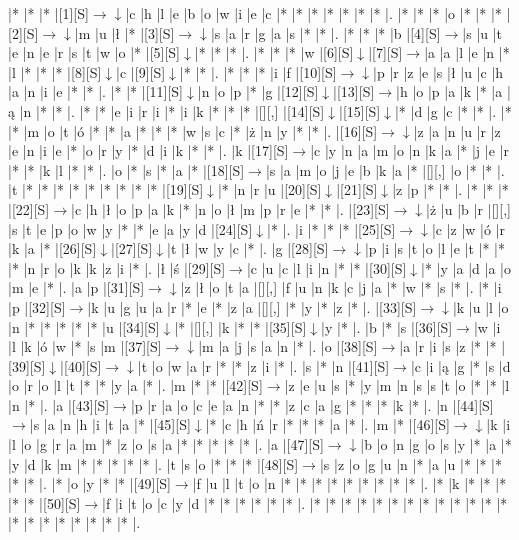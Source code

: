 \documentclass[11pt]{article}
\newcommand\drarr{$\rightarrow \!\!\!\!\! \downarrow$}
\newcommand\rarr{$\rightarrow$}
\newcommand\darr{$\downarrow$}
\begin{document}
\noindent\begin{Puzzle}{20}{31}|*	|*	|*	|[1][S]\drarr	|c	|h	|l	|e	|b	|o	|w	|i	|e	|c	|*	|*	|*	|*	|*	|*	|*	|.
|*	|*	|*	|o	|*	|*	|*	|[2][S]\drarr	|m	|u	|ł	|*	|[3][S]\drarr	|s	|a	|r	|g	|a	|s	|*	|*	|.
|*	|*	|*	|b	|[4][S]\rarr	|s	|u	|t	|e	|n	|e	|r	|s	|t	|w	|o	|*	|[5][S]\darr	|*	|*	|*	|.
|*	|*	|*	|w	|[6][S]\darr	|[7][S]\rarr	|a	|a	|l	|e	|n	|*	|l	|*	|*	|*	|[8][S]\darr	|c	|[9][S]\darr	|*	|*	|.
|*	|*	|*	|i	|f	|[10][S]\drarr	|p	|r	|z	|e	|s	|ł	|u	|c	|h	|a	|n	|i	|e	|*	|*	|.
|*	|*	|[11][S]\darr	|n	|o	|p	|*	|g	|[12][S]\darr	|[13][S]\rarr	|h	|o	|p	|a	|k	|*	|a	|ą	|n	|*	|*	|.
|*	|*	|e	|i	|r	|i	|*	|i	|k	|*	|*	|*	|[][,]{ }	|[14][S]\darr	|[15][S]\darr	|*	|d	|g	|c	|*	|*	|.
|*	|*	|m	|o	|t	|ó	|*	|*	|a	|*	|*	|*	|w	|s	|c	|*	|ż	|n	|y	|*	|*	|.
|[16][S]\drarr	|z	|a	|n	|u	|r	|z	|e	|n	|i	|e	|*	|o	|r	|y	|*	|d	|i	|k	|*	|*	|.
|k	|[17][S]\rarr	|c	|y	|n	|a	|m	|o	|n	|k	|a	|*	|j	|e	|r	|*	|*	|k	|l	|*	|*	|.
|o	|*	|s	|*	|a	|*	|[18][S]\rarr	|s	|a	|m	|o	|j	|e	|b	|k	|a	|*	|[][,]{ }	|o	|*	|*	|.
|t	|*	|*	|*	|*	|*	|*	|*	|*	|*	|[19][S]\darr	|*	|n	|r	|u	|[20][S]\darr	|[21][S]\darr	|z	|p	|*	|*	|.
|*	|*	|*	|[22][S]\rarr	|c	|h	|ł	|o	|p	|a	|k	|*	|n	|o	|ł	|m	|p	|r	|e	|*	|*	|.
|[23][S]\drarr	|ż	|u	|b	|r	|[][,]{ }	|s	|t	|e	|p	|o	|w	|y	|*	|*	|e	|a	|y	|d	|[24][S]\darr	|*	|.
|i	|*	|*	|*	|[25][S]\drarr	|c	|z	|w	|ó	|r	|k	|a	|*	|[26][S]\darr	|[27][S]\darr	|t	|ł	|w	|y	|c	|*	|.
|g	|[28][S]\drarr	|p	|i	|s	|t	|o	|l	|e	|t	|*	|*	|*	|n	|r	|o	|k	|k	|z	|i	|*	|.
|ł	|ś	|[29][S]\rarr	|c	|u	|c	|l	|i	|n	|*	|*	|[30][S]\darr	|*	|y	|a	|d	|a	|o	|m	|e	|*	|.
|a	|p	|[31][S]\drarr	|z	|ł	|o	|t	|a	|[][,]{ }	|f	|u	|n	|k	|c	|j	|a	|*	|w	|*	|s	|*	|.
|*	|i	|p	|[32][S]\rarr	|k	|u	|g	|u	|a	|r	|*	|e	|*	|z	|a	|[][,]{ }	|*	|y	|*	|z	|*	|.
|[33][S]\drarr	|k	|u	|l	|o	|n	|*	|*	|*	|*	|*	|u	|[34][S]\darr	|*	|[][,]{ }	|k	|*	|*	|[35][S]\darr	|y	|*	|.
|b	|*	|s	|[36][S]\rarr	|w	|i	|l	|k	|ó	|w	|*	|s	|m	|[37][S]\drarr	|m	|a	|j	|s	|a	|n	|*	|.
|o	|[38][S]\rarr	|a	|r	|i	|s	|z	|*	|*	|[39][S]\darr	|[40][S]\drarr	|t	|o	|w	|a	|r	|*	|*	|z	|i	|*	|.
|s	|*	|n	|[41][S]\rarr	|c	|i	|ą	|g	|*	|s	|d	|o	|r	|o	|l	|t	|*	|*	|y	|a	|*	|.
|m	|*	|*	|[42][S]\rarr	|z	|e	|u	|s	|*	|y	|m	|n	|s	|s	|t	|o	|*	|*	|l	|n	|*	|.
|a	|[43][S]\rarr	|p	|r	|a	|o	|c	|e	|a	|n	|*	|*	|z	|c	|a	|g	|*	|*	|*	|k	|*	|.
|n	|[44][S]\rarr	|s	|a	|n	|h	|i	|t	|a	|*	|[45][S]\darr	|*	|c	|h	|ń	|r	|*	|*	|*	|a	|*	|.
|m	|*	|[46][S]\drarr	|k	|i	|l	|o	|g	|r	|a	|m	|*	|z	|o	|s	|a	|*	|*	|*	|*	|*	|.
|a	|[47][S]\drarr	|b	|o	|n	|g	|o	|s	|y	|*	|a	|*	|y	|d	|k	|m	|*	|*	|*	|*	|*	|.
|t	|s	|o	|*	|*	|*	|[48][S]\rarr	|s	|z	|o	|g	|u	|n	|*	|a	|u	|*	|*	|*	|*	|*	|.
|*	|o	|y	|*	|*	|[49][S]\rarr	|f	|u	|l	|t	|o	|n	|*	|*	|*	|*	|*	|*	|*	|*	|*	|.
|*	|k	|*	|*	|*	|*	|*	|[50][S]\rarr	|f	|i	|t	|o	|c	|y	|d	|*	|*	|*	|*	|*	|*	|.
|*	|*	|*	|*	|*	|*	|*	|*	|*	|*	|*	|*	|*	|*	|*	|*	|*	|*	|*	|*	|*	|.\end{Puzzle}
\end{document}
